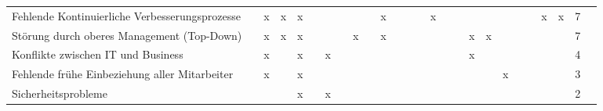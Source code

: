 \begin{sidewaystable}[ht]
\begin{tabular}{|p{6.5cm}|c|c|c|c|c|c|c|c|c|c|c|c|c|c|c|c|c|c|c|c|c|c|c|c|c|}
		Fehlende Kontinuierliche Verbesserungsprozesse  &                   & x                  & x                  & x                    &                    &                   &                   &                      &                    & x                    &                  &                  &                     & x                &                 &                      &                    &                 &                  &                  &                        & x                    & x                      & 7  \\
		Störung durch oberes Management (Top-Down)      &                   & x                  & x                  & x                    &                    &                   &                   & x                    &                    & x                    &                  &                  &                     &                  &                 &                      & x                  & x               &                  &                  &                        &                      &                        & 7  \\
		Konflikte zwischen IT und Business              &                   & x                  &                    & x                    &                    & x                 &                   &                      &                    &                      &                  &                  &                     &                  &                 &                      & x                  &                 &                  &                  &                        &                      &                        & 4  \\
		Fehlende frühe Einbeziehung aller Mitarbeiter   &                   & x                  &                    & x                    &                    &                   &                   &                      &                    &                      &                  &                  &                     &                  &                 &                      &                    &                 & x                &                  &                        &                      &                        & 3  \\
		Sicherheitsprobleme                             &                   &                    &                    & x                    &                    & x                 &                   &                      &                    &                      &                  &                  &                     &                  &                 &                      &                    &                 &                  &                  &                        &                      &                        & 2  \\

\end{tabular}
\end{sidewaystable}
